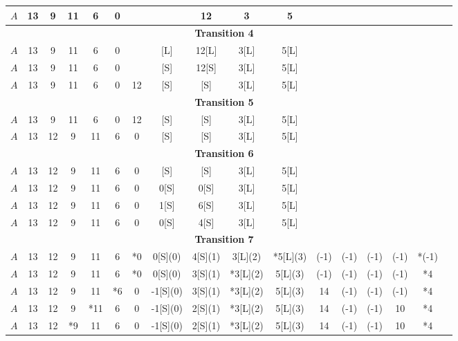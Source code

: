 \begin{center}
{\begin{tabular}{ | l | c | c | c | c | c | c | c | c | c | c | c | c | c | c | c | c | }
                $A$  & 13 & 9 & 11 & 6 & 0 & & & 12 & 3 & 5 & & & & &  \\ \hline
                \multicolumn{16}{c}{\textbf{Transition 4}}\\
                \hline
                $A$  & 13 & 9 & 11 & 6 & 0 & & [L] & 12[L] & 3[L] & 5[L] & & & & &  \\ \hline
                $A$  & 13 & 9 & 11 & 6 & 0 & & [S] & 12[S] & 3[L] & 5[L] & & & & &  \\ \hline
                $A$  & 13 & 9 & 11 & 6 & 0 & 12 & [S] & [S] & 3[L] & 5[L] & & & & &  \\ \hline
                \multicolumn{16}{c}{\textbf{Transition 5}}\\
                \hline
                $A$  & 13 & 9 & 11 & 6 & 0 & 12 & [S] & [S] & 3[L] & 5[L] & & & & &  \\ \hline
                $A$  & 13 & 12 & 9 & 11 & 6 & 0 & [S] & [S] & 3[L] & 5[L] & & & & &  \\ \hline
                \multicolumn{16}{c}{\textbf{Transition 6}}\\
                \hline
                $A$  & 13 & 12 & 9 & 11 & 6 & 0 & [S] & [S] & 3[L] & 5[L] & & & & &  \\ \hline
                $A$  & 13 & 12 & 9 & 11 & 6 & 0 & 0[S] & 0[S] & 3[L] & 5[L] & & & & &  \\ \hline
                $A$  & 13 & 12 & 9 & 11 & 6 & 0 & 1[S] & 6[S] & 3[L] & 5[L] & & & & &  \\ \hline
                $A$  & 13 & 12 & 9 & 11 & 6 & 0 & 0[S] & 4[S] & 3[L] & 5[L] & & & & &  \\ \hline
                \multicolumn{16}{c}{\textbf{Transition 7}}\\
                \hline
                $A$  & 13 & 12 & 9 & 11 & 6 & *0 & 0[S](0) & 4[S](1) & 3[L](2) & *5[L](3) & (-1) & (-1) & (-1) & (-1) & *(-1)  \\ \hline
                $A$  & 13 & 12 & 9 & 11 & 6 & *0 & 0[S](0) & 3[S](1) & *3[L](2) & 5[L](3) & (-1) & (-1) & (-1) & (-1) & *4  \\ \hline
                $A$  & 13 & 12 & 9 & 11 & *6 & 0 & -1[S](0) & 3[S](1) & *3[L](2) & 5[L](3) & 14 & (-1) & (-1) & (-1) & *4  \\ \hline
                $A$  & 13 & 12 & 9 & *11 & 6 & 0 & -1[S](0) & 2[S](1) & *3[L](2) & 5[L](3) & 14 & (-1) & (-1) & 10 & *4  \\ \hline
                $A$  & 13 & 12 & *9 & 11 & 6 & 0 & -1[S](0) & 2[S](1) & *3[L](2) & 5[L](3) & 14 & (-1) & (-1) & 10 & *4  \\ \hline

\end{tabular}}
\end{center}
